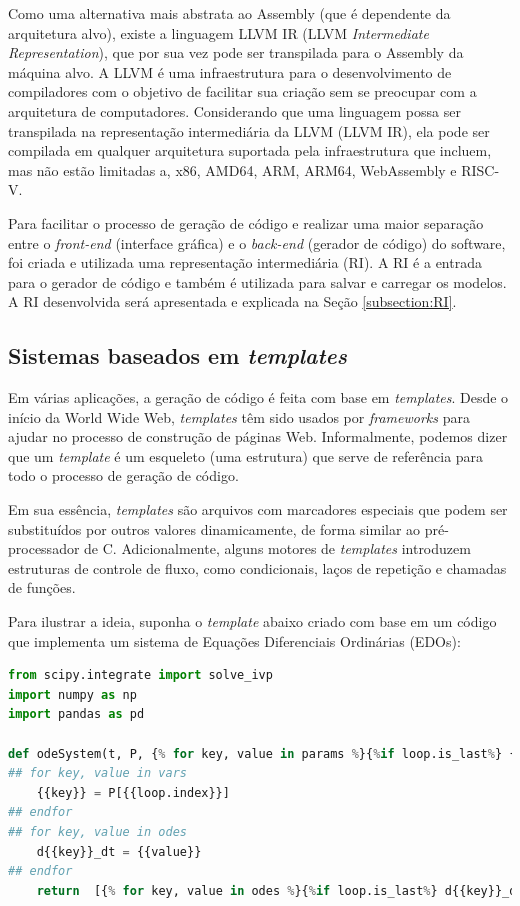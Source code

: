 \documentclass[
	12pt,				%
	openright,			%
	oneside,			%
	a4paper,			%
	main=brazil,
	english,			%
	]{ufsj-abntex2}
\begin{document}
Como uma alternativa mais abstrata ao Assembly (que é dependente da arquitetura alvo), existe a linguagem LLVM IR (LLVM \textit{Intermediate Representation}), que por sua vez pode ser transpilada para o Assembly da máquina alvo. A LLVM é uma infraestrutura para o desenvolvimento de compiladores com o objetivo de facilitar sua criação sem se preocupar com a arquitetura de computadores. Considerando que uma linguagem possa ser transpilada na representação intermediária da LLVM (LLVM IR), ela pode ser compilada em qualquer arquitetura suportada pela infraestrutura que incluem, mas não estão limitadas a, x86, AMD64, ARM, ARM64, WebAssembly e RISC-V.

Para facilitar o processo de geração de código e realizar uma maior separação entre o \textit{front-end} (interface gráfica) e o \textit{back-end} (gerador de código) do software, foi criada e utilizada uma representação intermediária (RI). A RI é a entrada para o gerador de código e também é utilizada para salvar e carregar os modelos. A RI desenvolvida será apresentada e explicada na Seção \ref{subsection:RI}.

\subsection{Sistemas baseados em \textit{templates}}
 
Em várias aplicações, a geração de código é feita com base em \textit{templates}. Desde o início da World Wide Web, \textit{templates} têm sido usados por \textit{frameworks} para ajudar no processo de construção de páginas Web. Informalmente, podemos dizer que um \textit{template} é um esqueleto (uma estrutura) que serve de referência para todo o processo de geração de código.

Em sua essência, \textit{templates} são arquivos com marcadores especiais que podem ser substituídos por outros valores dinamicamente, de forma similar ao pré-processador de C. Adicionalmente, alguns motores de \textit{templates} introduzem estruturas de controle de fluxo, como condicionais, laços de repetição e chamadas de funções. 

Para ilustrar a ideia, suponha o \textit{template} abaixo criado com base em um código que implementa um sistema de Equações Diferenciais Ordinárias (EDOs):  

\begin{lstlisting}[language=Python, firstnumber=1]
from scipy.integrate import solve_ivp
import numpy as np
import pandas as pd

def odeSystem(t, P, {% for key, value in params %}{%if loop.is_last%} {{key}} {%else%} {{key}}, {%endif%}{%endfor%}):
## for key, value in vars
    {{key}} = P[{{loop.index}}]
## endfor
## for key, value in odes
    d{{key}}_dt = {{value}}
## endfor     
    return  [{% for key, value in odes %}{%if loop.is_last%} d{{key}}_dt {%else%} d{{key}}_dt, {%endif%}{%endfor%}]
\end{lstlisting}
\end{document}
